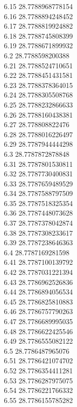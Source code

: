 {6.15	28.7788968778154\\
6.16	28.7788894248452\\
6.17	28.7788819924882\\
6.18	28.7788745808399\\
6.19	28.7788671899932\\
6.2	28.7788598200388\\
6.21	28.7788524710651\\
6.22	28.7788451431581\\
6.23	28.7788378364015\\
6.24	28.7788305508768\\
6.25	28.7788232866633\\
6.26	28.7788160438381\\
6.27	28.778808822476\\
6.28	28.7788016226497\\
6.29	28.7787944444298\\
6.3	28.7787872878848\\
6.31	28.7787801530811\\
6.32	28.7787730400831\\
6.33	28.7787659489529\\
6.34	28.7787588797509\\
6.35	28.7787518325354\\
6.36	28.7787448073628\\
6.37	28.7787378042874\\
6.38	28.7787308233617\\
6.39	28.7787238646363\\
6.4	28.7787169281598\\
6.41	28.7787100139792\\
6.42	28.7787031221394\\
6.43	28.7786962526836\\
6.44	28.7786894056534\\
6.45	28.7786825810883\\
6.46	28.7786757790263\\
6.47	28.7786689995035\\
6.48	28.7786622425546\\
6.49	28.7786555082122\\
6.5	28.7786487965076\\
6.51	28.7786421074702\\
6.52	28.7786354411281\\
6.53	28.7786287975075\\
6.54	28.7786221766332\\
6.55	28.7786155785282\\
}
